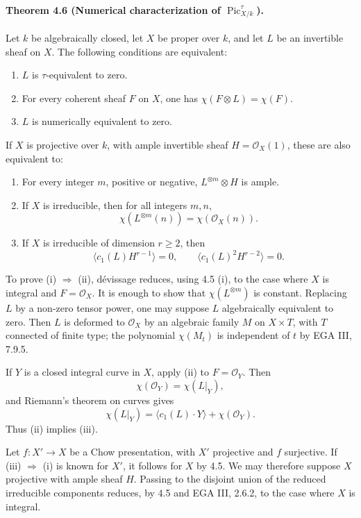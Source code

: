 \documentclass[12pt]{article}
\newcommand{\cO}{\mathcal O}
\newcommand{\Pic}{\operatorname{Pic}}
\begin{document}
\paragraph{Theorem 4.6 (Numerical characterization of $\Pic^\tau_{X/k}$).}
Let $k$ be algebraically closed, let $X$ be proper over $k$, and let $L$ be an invertible sheaf on $X$. The following conditions are equivalent:
\begin{enumerate}[label=\roman*)]
\item $L$ is $\tau$-equivalent to zero.
\item For every coherent sheaf $F$ on $X$, one has $\chi(F\otimes L)=\chi(F)$.
\item $L$ is numerically equivalent to zero.
\end{enumerate}
If $X$ is projective over $k$, with ample invertible sheaf $H=\cO_X(1)$, these are also equivalent to:
\begin{enumerate}[label=\roman*),resume]
\item For every integer $m$, positive or negative, $L^{\otimes m}\otimes H$ is ample.
\item If $X$ is irreducible, then for all integers $m,n$,
\[
\chi(L^{\otimes m}(n))=\chi(\cO_X(n)).
\]
\item If $X$ is irreducible of dimension $r\geq 2$, then
\[
\langle c_1(L)H^{r-1}\rangle=0,\qquad
\langle c_1(L)^2H^{r-2}\rangle=0.
\]
\end{enumerate}

To prove (i) $\Rightarrow$ (ii), dévissage reduces, using 4.5 (i), to the case where $X$ is integral and $F=\cO_X$. It is enough to show that $\chi(L^{\otimes m})$ is constant. Replacing $L$ by a non-zero tensor power, one may suppose $L$ algebraically equivalent to zero. Then $L$ is deformed to $\cO_X$ by an algebraic family $M$ on $X\times T$, with $T$ connected of finite type; the polynomial $\chi(M_t)$ is independent of $t$ by EGA III, 7.9.5.

If $Y$ is a closed integral curve in $X$, apply (ii) to $F=\cO_Y$. Then
\[
\chi(\cO_Y)=\chi(L|_Y),
\]
and Riemann's theorem on curves gives
\[
\chi(L|_Y)=\langle c_1(L)\cdot Y\rangle+\chi(\cO_Y).
\]
Thus (ii) implies (iii).

Let $f:X'\to X$ be a Chow presentation, with $X'$ projective and $f$ surjective. If (iii) $\Rightarrow$ (i) is known for $X'$, it follows for $X$ by 4.5. We may therefore suppose $X$ projective with ample sheaf $H$. Passing to the disjoint union of the reduced irreducible components reduces, by 4.5 and EGA III, 2.6.2, to the case where $X$ is integral.
\end{document}
